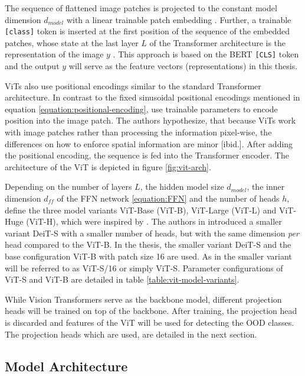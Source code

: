 The sequence of flattened image patches is projected to the constant model dimension $d_{model}$ with a linear trainable patch embedding \citep{Dosovitskiy2020,Vaswani2017}.
Further, a trainable \texttt{[class]} token is inserted at the first position of the sequence of the embedded patches, whose state at the last layer $L$ of the Transformer architecture is the representation of the image $y$ \citep{Dosovitskiy2020}.
This approach is based on the BERT \texttt{[CLS]} token \citep{Devlin2018} and the output $y$ will serve as the feature vectors (representations) in this thesis.
\par
ViTs also use positional encodings similar to the standard Transformer architecture.
In contrast to the fixed sinusoidal positional encodings mentioned in equation \ref{equation:positional-encoding}, \citep{Dosovitskiy2020} use trainable parameters to encode position into the image patch.
The authors hypothesize, that because ViTs work with image patches rather than processing the information pixel-wise, the differences on how to enforce spatial information are minor [ibid.].
After adding the positional encoding, the sequence is fed into the Transformer encoder.
The architecture of the ViT is depicted in figure \ref{fig:vit-arch}.
\par
Depending on the number of layers $L$, the hidden model size $d_{model}$, the inner dimension $d_{ff}$ of the FFN network \ref{equation:FFN} and the number of heads $h$, \citep{Dosovitskiy2020} define the three model variants ViT-Base (ViT-B), ViT-Large (ViT-L) and ViT-Huge (ViT-H), which were inspired by \citep{Devlin2018}.
The authors in \citep{Touvron2020} introduced a smaller variant DeiT-S with a smaller number of heads, but with the same dimension \textit{per} head compared to the ViT-B.
In the thesis, the smaller variant DeiT-S \citep{Touvron2020} and the base configuration ViT-B with patch size 16 are used.
As in \citep{Caron2021} the smaller variant will be referred to as ViT-S/16 or simply ViT-S.
Parameter configurations of ViT-S and ViT-B are detailed in table \ref{table:vit-model-variants}.
\par
While Vision Transformers serve as the backbone model, different projection heads will be trained on top of the backbone. 
After training, the projection head is discarded and features of the ViT will be used for detecting the OOD classes.
The projection heads which are used, are detailed in the next section.
\subsection{Model Architecture}
